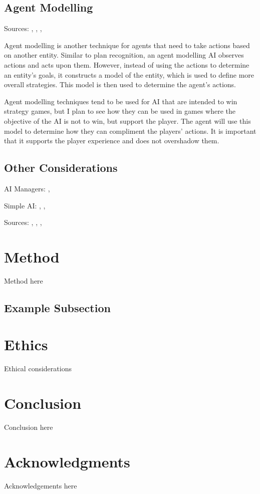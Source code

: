 \documentclass{IEEEtran}
\begin{document}
\subsection{Agent Modelling}
\label{AgentModelling}
 
Sources: \cite{EvaluatingHanabiAgents}, \cite{OpponentModellingRTS2007}, \cite{bakkes2009opponentmodelling}, \cite{yannakakis2013playermodelling}

Agent modelling is another technique for agents that need to take actions based on another entity. Similar to plan recognition, an agent modelling AI observes actions and acts upon them. However, instead of using the actions to determine an entity’s goals, it constructs a model of the entity, which is used to define more overall strategies. This model is then used to determine the agent's actions.

Agent modelling techniques tend to be used for AI that are intended to win strategy games, but I plan to see how they can be used in games where the objective of the AI is not to win, but support the player. The agent will use this model to determine how they can compliment the players’ actions. It is important that it supports the player experience and does not overshadow them.

\subsection{Other Considerations}
\label{OtherConsiderations}

AI Managers: \cite{GAIPKungFuCircle}, \cite{GDCSpiderman}

Simple AI: \cite{GMTGoodAI}, \cite{GDCLessIsMore}, \cite{GDCSimplestAITrick}

Sources: \cite{WaitASecond2019}, \cite{SocialPerceptions2020}, \cite{TheoryOfMind2013}, \cite{von2017mindsofmany}
 
\section{Method}
\label{Method}

Method here

 \subsection{Example Subsection}
 
\section{Ethics}
\label{Ethics}

Ethical considerations
 
\section{Conclusion}
\label{Conc}
 
Conclusion here 
 
\section*{Acknowledgments}

Acknowledgements here


 
\end{document}
